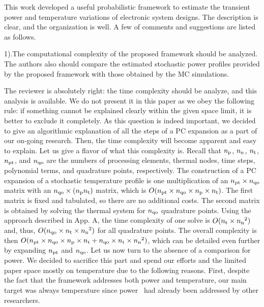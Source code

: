 \begin{reviewer}
This work developed a useful probabilistic framework to estimate the transient power and temperature variations of electronic system designs. The description is clear, and the organization is well. A few of comments and suggestions are listed as follows.

1).The computational complexity of the proposed framework should be analyzed. The authors also should compare the estimated stochastic power profiles provided by the proposed framework with those obtained by the MC simulations.
\end{reviewer}
\begin{authors}
The reviewer is absolutely right: the time complexity should be analyze, and this analysis is available.
We do not present it in this paper as we obey the following rule: if something cannot be explained clearly within the given space limit, it is better to exclude it completely.
As this question is indeed important, we decided to give an algorithmic explanation of all the steps of a PC expansion as a part of our on-going research.
Then, the time complexity will become apparent and easy to explain. Let us give a flavor of what this complexity is.
Recall that ${n_\text{p}}$, ${n_\text{n}}$, ${n_\text{t}}$, ${n_\text{pt}}$, and ${n_\text{qo}}$ are the numbers of processing elements, thermal nodes, time steps, polynomial terms, and quadrature points, respectively.
The construction of a PC expansion of a stochastic temperature profile is one multiplication of an ${n_\text{pt}} \times {n_\text{qo}}$ matrix with an ${n_\text{qo}} \times ({n_\text{p}} {n_\text{t}})$ matrix, which is $O({n_\text{pt}} \times {n_\text{qo}} \times {n_\text{p}} \times {n_\text{t}})$.
The first matrix is fixed and tabulated, so there are no additional costs.
The second matrix is obtained by solving the thermal system for ${n_\text{qo}}$ quadrature points.
Using the approach described in App. A, the time complexity of one solve is $O({n_\text{t}} \times {n_\text{n}}^2)$ and, thus, $O({n_\text{qo}} \times {n_\text{t}} \times {n_\text{n}}^2)$ for all quadrature points.
The overall complexity is then $O({n_\text{pt}} \times {n_\text{qo}} \times {n_\text{p}} \times {n_\text{t}} + {n_\text{qo}} \times {n_\text{t}} \times {n_\text{n}}^2)$, which can be detailed even further by expanding ${n_\text{pt}}$ and ${n_\text{qo}}$.
Let us now turn to the absence of a comparison for power.
We decided to sacrifice this part and spend our efforts and the limited paper space mostly on temperature due to the following reasons.
First, despite the fact that the framework addresses both power and temperature, our main target was always temperature since power \perse\ had already been addressed by other researchers.

\end{authors}
